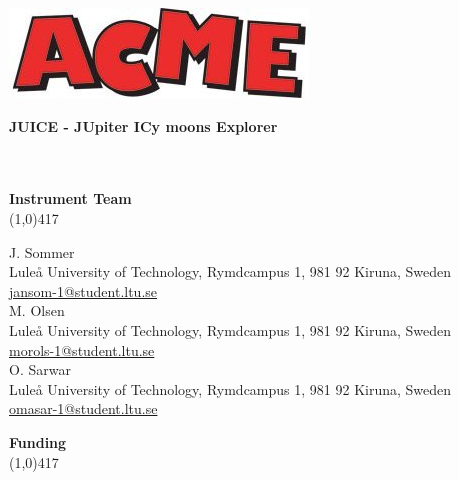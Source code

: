 \begin{titlepage}
\begin{center}
\begin{flushright}
\includegraphics[scale=0.75]{figures/Logo.jpg}
\end{flushright}
%
\begin{flushleft}
\vspace{10mm}
\Large \bfseries{JUICE - JUpiter ICy moons Explorer}\\
\Large \bfseries{\doctitle}\\ 
\Large \bfseries{\docsubtitle}\\
%
\vspace{15mm}
%
%
%
\begin{normalsize}
%
\textbf{Instrument Team}\\
\vspace{-1.0em}
\line(1,0){417}\\
%
\end{normalsize}
%
\begin{small}
J. Sommer\\
Lule\r{a} University of Technology, Rymdcampus 1, 981 92 Kiruna, Sweden\\
\href{mailto:jansom-1@student.ltu.se}{jansom-1@student.ltu.se}\\[5mm]
%
M. Olsen\\
Lule\r{a} University of Technology, Rymdcampus 1, 981 92 Kiruna, Sweden\\
\href{mailto:morols-1@student.ltu.se}{morols-1@student.ltu.se}\\[5mm]
%
O. Sarwar\\
Lule\r{a} University of Technology, Rymdcampus 1, 981 92 Kiruna, Sweden\\
\href{mailto:omasar-1@student.ltu.se}{omasar-1@student.ltu.se}\\
\end{small}
%
\vspace{20mm}
%
\begin{normalsize}
%
\textbf{Funding}\\
\vspace{-1.0em}
\line(1,0){417}\\
%
\end{normalsize}
%
\begin{small}

\end{small}
\end{flushleft}
\end{center}
\end{titlepage}
